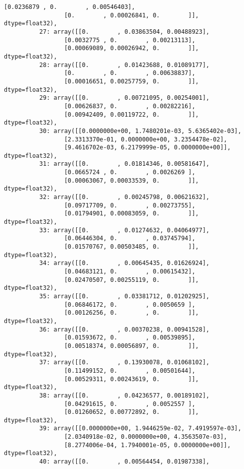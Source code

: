 \documentclass[11pt]{article}
\begin{document}
\begin{Verbatim}[commandchars=\\\{\}]
                 [0.0236879 , 0.        , 0.00546403],
                 [0.        , 0.00026841, 0.        ]], dtype=float32),
          27: array([[0.        , 0.03863504, 0.00488923],
                 [0.0032775 , 0.        , 0.00213113],
                 [0.00069089, 0.00026942, 0.        ]], dtype=float32),
          28: array([[0.        , 0.01423688, 0.01089177],
                 [0.        , 0.        , 0.00638837],
                 [0.00016651, 0.00257759, 0.        ]], dtype=float32),
          29: array([[0.        , 0.00721095, 0.00254001],
                 [0.00626837, 0.        , 0.00282216],
                 [0.00942409, 0.00119722, 0.        ]], dtype=float32),
          30: array([[0.0000000e+00, 1.7480201e-03, 5.6365402e-03],
                 [2.3313370e-01, 0.0000000e+00, 3.2354478e-02],
                 [9.4616702e-03, 6.2179999e-05, 0.0000000e+00]], dtype=float32),
          31: array([[0.        , 0.01814346, 0.00581647],
                 [0.0665724 , 0.        , 0.0026269 ],
                 [0.00063067, 0.00033539, 0.        ]], dtype=float32),
          32: array([[0.        , 0.00245798, 0.00621632],
                 [0.09717709, 0.        , 0.00273755],
                 [0.01794901, 0.00083059, 0.        ]], dtype=float32),
          33: array([[0.        , 0.01274632, 0.04064977],
                 [0.06446304, 0.        , 0.03745794],
                 [0.01570767, 0.00503485, 0.        ]], dtype=float32),
          34: array([[0.        , 0.00645435, 0.01626924],
                 [0.04683121, 0.        , 0.00615432],
                 [0.02470507, 0.00255119, 0.        ]], dtype=float32),
          35: array([[0.        , 0.03381712, 0.01202925],
                 [0.06846172, 0.        , 0.0050659 ],
                 [0.00126256, 0.        , 0.        ]], dtype=float32),
          36: array([[0.        , 0.00370238, 0.00941528],
                 [0.01593672, 0.        , 0.00539895],
                 [0.00518374, 0.00056897, 0.        ]], dtype=float32),
          37: array([[0.        , 0.13930078, 0.01068102],
                 [0.11499152, 0.        , 0.00501644],
                 [0.00529311, 0.00243619, 0.        ]], dtype=float32),
          38: array([[0.        , 0.04236577, 0.00189102],
                 [0.04291615, 0.        , 0.0052557 ],
                 [0.01260652, 0.00772892, 0.        ]], dtype=float32),
          39: array([[0.0000000e+00, 1.9446259e-02, 7.4919597e-03],
                 [2.0340918e-02, 0.0000000e+00, 4.3563507e-03],
                 [8.2774006e-04, 1.7940001e-05, 0.0000000e+00]], dtype=float32),
          40: array([[0.        , 0.00564454, 0.01987338],

\end{Verbatim}
\end{document}
